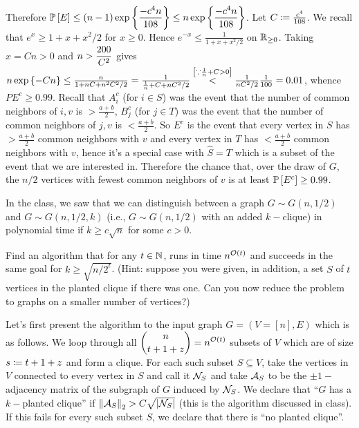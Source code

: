 Therefore $\ds \P{E} \le (n-1)\exp\set{\frac{-c^{4}n}{108}} \le n\exp\set{\frac{-c^{4}n}{108}}$. Let $C \sett \frac{c^{4}}{108}$. We recall that $e^{x} \ge 1+x+x^{2}/2$ for $x\ge 0$. Hence $e^{-x} \le \frac{1}{1+x+x^{2}/2}$ on $\R_{\ge 0}$. Taking $x=Cn>0$ and $\ds n>\frac{200}{C^{2}}$ gives $n\exp\set{-Cn} \le \frac{n}{1+nC+n^{2}C^{2}/2} = \frac{1}{\frac1n + C + nC^{2}/2} \stackrel{\left[\because \frac{1}{n}+C>0\right]}{<} \frac{1}{nC^{2}/2} \frac1{100} = 0.01$, whence $P{E^{c}} \ge 0.99$. Recall that $A_{i}^{c}$ (for $i\in S$) was the event that the number of common neighbors of $i,v$ is $>\frac{a+b}{2}$, $B_{j}^{c}$ (for $j\in T$) was the event that the number of common neighbors of $j,v$ is $<\frac{a+b}{2}$. So $E^{c}$ is the event that every vertex in $S$ has $>\frac{a+b}{2}$ common neighbors with $v$ and every vertex in $T$ has $<\frac{a+b}{2}$ common neighbors with $v$, hence it's a special case with $\hat S=T$ which is a subset of the event that we are interested in. Therefore the chance that, over the draw of $G$, the $n/2$ vertices with fewest common neighbors of $v$ is at least $\P{E^{c}} \ge 0.99$.






\newpage
\pb
In the class, we saw that we can distinguish between a graph $G\sim G(n,1/2)$ and $G\sim G(n,1/2,k)$ (i.e., $G\sim G(n,1/2)$ with an added $k-$clique) in polynomial time if $k\ge c\sqrt n$ for some $c > 0$. 

Find an algorithm that for any $t \in \N$, runs in time $n^{\cO(t)}$ and succeeds in the same goal for $k\ge \sqrt{n/2^{t}}$. (Hint: suppose you were given, in addition, a set $S$ of $t$ vertices in the planted clique if there was one. Can you now reduce the problem to graphs on a smaller number of vertices?)
\soln



Let's first present the algorithm to the input graph $G=(V=[n],E)$ which is as follows. {\color{blue}We loop through all $\ds{n\choose {t+1+z}} = n^{\cO(t)}$ subsets of $V$ which are of size $s \sett t+1+z$ and form a clique. For each such subset $S\subseteq V$, take the vertices in $V$ connected to every vertex in $S$ and call it $\cN_{S}$ and take $\cA_{S}$ to be the $\pm1-$adjacency matrix of the subgraph of $G$ induced by $\cN_{S}$. We declare that ``$G$ has a $k-$planted clique'' if $\norm{\cA_{S}}{2}>C\sqrt{\abs{\cN_{S}}}$ (this is the algorithm discussed in class). If this fails for every such subset $S$, we declare that there is ``no planted clique''.}

